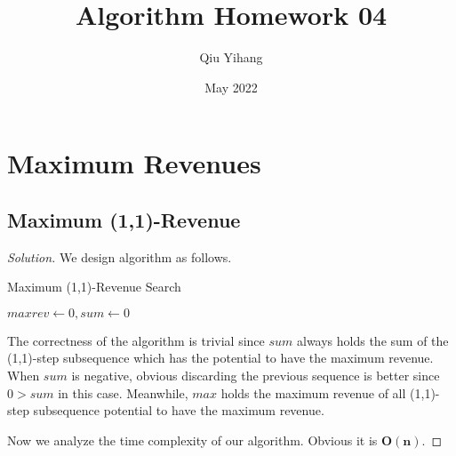 \documentclass{article}
\title{\textbf{Algorithm Homework 04}}
\author{Qiu Yihang}
\date{May 2022}
\newenvironment{solution}{\begin{proof}[\noindent\it Solution]}{\end{proof}}
\begin{document}
\maketitle

\section{Maximum Revenues}
\vspace{0.75em}
\subsection{Maximum (1,1)-Revenue}
\vspace{0.75em}
\begin{solution}
    We design algorithm as follows.
    
    \vspace{-0.5em}
    \begin{algorithm}
        \caption{Maximum (1,1)-Revenue Search}
        
	    {
	        $maxrev\gets 0, sum\gets0$\;
	   }
    \end{algorithm}
    
    \vspace{-1em} \hspace{0.5em}
    The correctness of the algorithm is trivial since $sum$ always holds the sum of the (1,1)-step subsequence which has the potential to have the maximum revenue. When $sum$ is negative, obvious discarding the previous sequence is better since $0>sum$ in this case. Meanwhile, $max$ holds the maximum revenue of all (1,1)-step subsequence potential to have the maximum revenue.
    
    \hspace{0.5em}
    Now we analyze the time complexity of our algorithm. Obvious it is \underline{$\boldsymbol{O(n)}$}.
\end{solution}

\vspace{0.75em}
\end{document}
